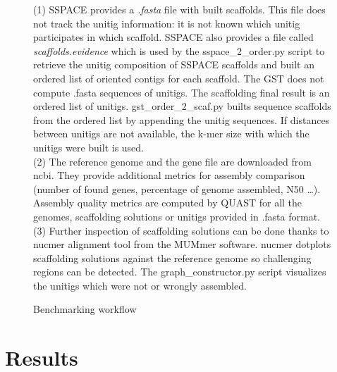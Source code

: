 \documentclass[12pt]{article}
\begin{document}
\begin{figure}[h!]
{
}
\caption{Benchmarking workflow}
\label{fig:benchwork}
\footnotesize (1) SSPACE provides a \textit{.fasta} file with built scaffolds. This file does not track the unitig information: it is not known which unitig participates in which scaffold. SSPACE also provides a file called \textit{scaffolds.evidence} which is used by the sspace\_2\_order.py script to retrieve the unitig composition of SSPACE scaffolds and built an ordered list of oriented contigs for each scaffold. The GST does not compute .fasta sequences of unitigs. The scaffolding final result is an ordered list of unitigs. gst\_order\_2\_scaf.py builts sequence scaffolds from the ordered list by appending the unitig sequences. If distances between unitigs are not available, the k-mer size with which the unitigs were built is used. \\
\footnotesize (2) The reference genome and the gene file are downloaded from ncbi. They provide additional metrics for assembly comparison (number of found genes, percentage of genome assembled, N50 \ldots). Assembly quality metrics are computed by QUAST for all the genomes, scaffolding solutions or unitigs provided in .fasta format. \\
\footnotesize (3) Further inspection of scaffolding solutions can be done thanks to nucmer alignment tool from the MUMmer software. nucmer dotplots scaffolding solutions against the reference genome so challenging regions can be detected. The graph\_constructor.py script visualizes the unitigs which were not or wrongly assembled.
\end{figure}

\clearpage
\section{Results}\label{sec:res}
\end{document}
